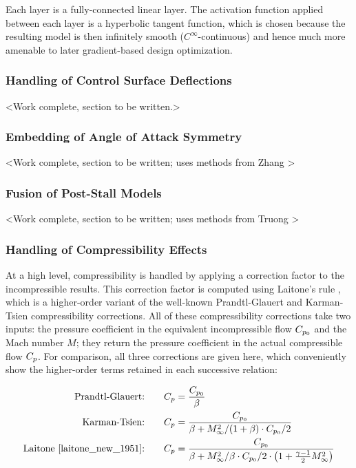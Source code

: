 \documentclass[conf]{new-aiaa}
\begin{document}
    Each layer is a fully-connected linear layer. The activation function applied between each layer is a hyperbolic tangent function, which is chosen because the resulting model is then infinitely smooth ($C^\infty$-continuous) and hence much more amenable to later gradient-based design optimization.

    \subsubsection{Handling of Control Surface Deflections}
    \label{sec:control-surfaces}

    <Work complete, section to be written.>

    \subsubsection{Embedding of Angle of Attack Symmetry}

    <Work complete, section to be written; uses methods from Zhang \cite{zhang_threedimensional_2022}>

    \subsubsection{Fusion of Post-Stall Models}

    <Work complete, section to be written; uses methods from Truong \cite{truong_analytical_2020}>

    \subsubsection{Handling of Compressibility Effects}
    \label{sec:compressibility}

    At a high level, compressibility is handled by applying a correction factor to the incompressible results. This correction factor is computed using Laitone's rule \cite{laitone_new_1951}, which is a higher-order variant of the well-known Prandtl-Glauert and Karman-Tsien compressibility corrections. All of these compressibility corrections take two inputs: the pressure coefficient in the equivalent incompressible flow $C_{p_0}$ and the Mach number $M$; they return the pressure coefficient in the actual compressible flow $C_p$. For comparison, all three corrections are given here, which conveniently show the higher-order terms retained in each successive relation:

    \begin{align}
        \label{eq:prandtl-glauert} \text{Prandtl-Glauert:} \qquad & C_p = \frac{C_{p_0}}{\beta} \\
        \label{eq:karman-tsien} \text{Karman-Tsien:}\qquad    & C_p = \frac{C_{p_0}}{\beta + M_\infty^2 / (1 + \beta) \cdot C_{p_0} / 2} \\
        \label{eq:laitone} \text{Laitone \cite{laitone_new_1951}:}\qquad & C_p = \frac{C_{p_0}}{\beta + M_\infty^2 / \beta \cdot C_{p_0} / 2 \cdot \left( 1 + \frac{\gamma - 1}{2} M_\infty^2 \right)}
    \end{align}
\end{document}
